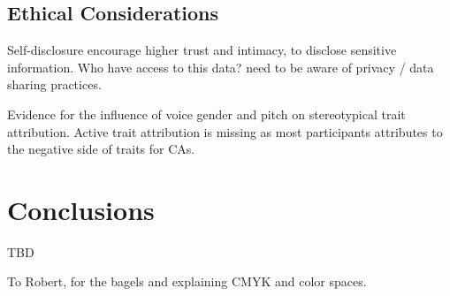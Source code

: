 \documentclass[sigconf,screen,review, anonymous]{acmart}
\newcommand{\cmt}[1]{}%
\begin{document}
\subsection{Ethical Considerations}

Self-disclosure encourage higher trust and intimacy, to disclose sensitive information. Who have access to this data? need to be aware of privacy / data sharing practices. \cite{lee2020hear}\cmt{[23]}

Evidence for the influence of voice gender and pitch on stereotypical trait attribution. Active trait attribution is missing as most participants attributes to the negative side of traits for CAs. \cite{cambre2019one}\cmt{[62]}

\section{Conclusions}

TBD


\begin{acks}
To Robert, for the bagels and explaining CMYK and color spaces.
\end{acks}




\appendix
\end{document}
